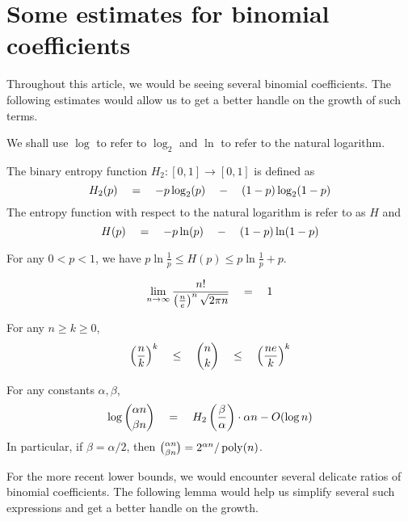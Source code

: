 \chapter{Some estimates for binomial coefficients}\label{chap:binom-estimates}

Throughout this article, we would be seeing several binomial coefficients.  
The following estimates would allow us to get a better handle on the growth of such terms. 

We shall use $\log$ to refer to $\log_2$ and $\ln$ to refer to the natural logarithm. 


\begin{definition}\label{def:entropy}
The binary entropy function $H_2:[0,1]\rightarrow [0,1]$ is defined as
\[
H_2(p) \quad = \quad - p \log_2(p) \quad - \quad (1-p) \log_2(1-p)
\]
The entropy function with respect to the natural logarithm is refer to as $H$ and
\[
H(p) \quad = \quad - p \ln(p) \quad - \quad (1-p) \ln(1-p)
\]
\end{definition}

\begin{proposition}\label{prop:entropy-estimate}
For any $0< p  < 1$, we have $p\ln\frac{1}{p} \leq H(p) \leq p\ln\frac{1}{p} + p$. 
\end{proposition}


\begin{proposition}\label{prop:sterling}
\[
\lim_{n\rightarrow \infty}\frac{n!}{\left(\frac{n}{e}\right)^n \sqrt{2\pi n}}  \quad=\quad 1
\]
\end{proposition}

\begin{proposition}\label{prop:binom-ub-lb}
For any $n \geq  k \geq 0$, 
\[
\left(\frac{n}{k}\right)^k \quad \leq \quad \binom{n}{k}\quad \leq \quad \left(\frac{ne}{k}\right)^k
\]
\end{proposition}


\begin{proposition}
For any constants $\alpha, \beta$, 
\[
\log\binom{\alpha n}{\beta n} \quad = \quad H_2\left(\frac{\beta}{\alpha}\right) \cdot \alpha n - O(\log n)
\]
In particular, if $\beta = \alpha/2$, then $\binom{\alpha n}{\beta{n}} = 2^{\alpha n} / \operatorname{poly}(n)$. 
\end{proposition}

For the more recent lower bounds, we would encounter several delicate ratios of binomial coefficients. 
The following lemma would help us simplify several such expressions and get a better handle on the growth. 

